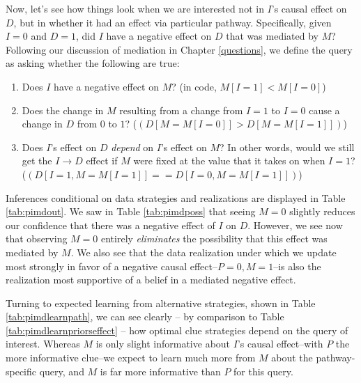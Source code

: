 \documentclass[
  12pt,
]{book}
\providecommand{\tightlist}{%
  \setlength{\itemsep}{0pt}\setlength{\parskip}{0pt}}
\begin{document}
Now, let's see how things look when we are interested not in \(I\)'s causal effect on \(D\), but in whether it had an effect via particular pathway. Specifically, given \(I=0\) and \(D=1\), did \(I\) have a negative effect on \(D\) that was mediated by \(M\)? Following our discussion of mediation in Chapter \ref{questions}, we define the query as asking whether the following are true:

\begin{enumerate}
\def\labelenumi{\arabic{enumi}.}
\tightlist
\item
  Does \(I\) have a negative effect on \(M\)? (in code, \(M[I=1] < M[I=0]\))
\item
  Does the change in \(M\) resulting from a change from \(I=1\) to \(I=0\) cause a change in \(D\) from \(0\) to \(1\)? (\((D[M=M[I=0]] > D[M=M[I=1]])\))
\item
  Does \(I\)'s effect on \(D\) \emph{depend} on \(I\)'s effect on \(M\)? In other words, would we still get the \(I \rightarrow D\) effect if \(M\) were fixed at the value that it takes on when \(I=1\)? (\((D[I=1, M=M[I=1]] == D[I=0, M=M[I=1]])\))
\end{enumerate}

Inferences conditional on data strategies and realizations are displayed in Table \ref{tab:pimdout}. We saw in Table \ref{tab:pimdposs} that seeing \(M=0\) slightly reduces our confidence that there was a negative effect of \(I\) on \(D\). However, we see now that observing \(M=0\) entirely \emph{eliminates} the possibility that this effect was mediated by \(M\). We also see that the data realization under which we update most strongly in favor of a negative causal effect--\(P=0, M=1\)--is also the realization most supportive of a belief in a mediated negative effect.

Turning to expected learning from alternative strategies, shown in Table \ref{tab:pimdlearnpath}, we can see clearly -- by comparison to Table \ref{tab:pimdlearnpriorseffect} -- how optimal clue strategies depend on the query of interest. Whereas \(M\) is only slight informative about \(I\)'s causal effect--with \(P\) the more informative clue--we expect to learn much more from \(M\) about the pathway-specific query, and \(M\) is far more informative than \(P\) for this query.
\end{document}

